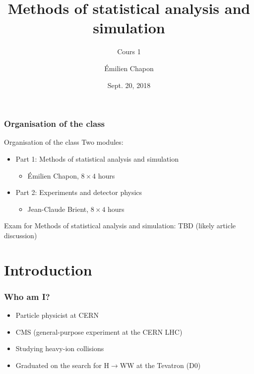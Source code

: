 \documentclass[9pt]{beamer}
\date[Stat1]{Sept. 20, 2018}
\title{Methods of statistical analysis and simulation}
\subtitle{Cours 1}
\author[E. Chapon]{Émilien Chapon}
\begin{document}
{

\begin{frame}
 \maketitle
 
\end{frame}
}

\begin{frame}
 \frametitle{Organisation of the class}
 
 \begin{block}{Organisation of the class}
  Two modules:
  
  \begin{itemize}
   \item Part 1: Methods of statistical analysis and simulation
   \begin{itemize}
    \item Émilien Chapon, $8\times 4$ hours
   \end{itemize}
   \item Part 2: Experiments and detector physics
   \begin{itemize}
    \item Jean-Claude Brient, $8\times 4$ hours
   \end{itemize}
  \end{itemize}

 \end{block}
 
 Exam for Methods of statistical analysis and simulation: TBD (likely article discussion)

\end{frame}

\section*{Introduction}

\begin{frame}
 \frametitle{Who am I?}
 
 \begin{itemize}
  \item Particle physicist at CERN
  \item CMS (general-purpose experiment at the CERN LHC)
  \item Studying heavy-ion collisions
  \item Graduated on the search for H$\to$WW at the Tevatron (D0)
 \end{itemize}

\end{frame}
\end{document}
